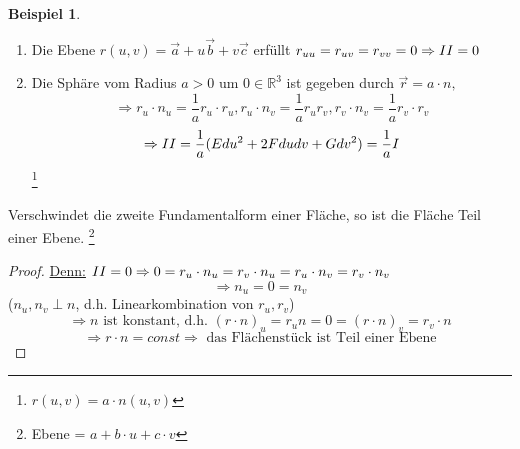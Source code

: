 \documentclass[a4paper,11pt,notitlepage]{report}
\theoremstyle{definition}
\newtheorem{example}{Beispiel}[chapter]
\newcommand{\R}{{\ensuremath{\mathbb{R}}}}
\newcommand{\RM}[1]{\MakeUppercase{\romannumeral #1{}}}
\begin{document}
\begin{example}
	\begin{enumerate}
		\item Die Ebene $r(u,v) = \vec{a} + u \vec{b} + v \vec{c}$ erfüllt $r_{uu} = r_{uv} = r_{vv} = 0 \Rightarrow \RM{2} = 0$
		\item Die Sphäre vom Radius $a > 0$ um $0 \in \R^3$ ist gegeben durch
		$\vec{r} = a \cdot n,$
		$$ \Rightarrow r_u \cdot n_u = \frac{1}{a} r_u \cdot r_u, r_u \cdot n_v = \frac{1}{a} r_u r_v, r_v \cdot n_v = \frac{1}{a} r_v \cdot r_v$$
		$$\Rightarrow \RM{2} = \frac{1}{a} (E du^2 + 2 F dudv + G dv^2) = \frac{1}{a} \RM{1}$$
		 \footnote{$r(u,v)= a \cdot n(u,v)$}
	\end{enumerate}
\end{example}

\begin{theorem}
	Verschwindet die zweite Fundamentalform einer Fläche, so ist die Fläche Teil einer Ebene. \footnote{Ebene = $a + b\cdot u + c \cdot v$}
\end{theorem}

	\begin{proof}
	\underline{Denn:} $\RM{2}=0 \Rightarrow 0 = r_u \cdot n_u = r_v \cdot n_u = r_u \cdot n_v = r_v \cdot n_v$
	$$\Rightarrow n_u = 0 = n_v$$
	($n_u, n_v \perp n$, d.h. Linearkombination von $r_u, r_v$)
	$$\Rightarrow n \text{ ist konstant, d.h. } (r \cdot n)_u = r_u n = 0 = (r \cdot n)_v = r_v \cdot n$$
	$$\Rightarrow r \cdot n = const \Rightarrow \text{ das Flächenstück ist Teil einer Ebene}$$
	\end{proof}
\end{document}
